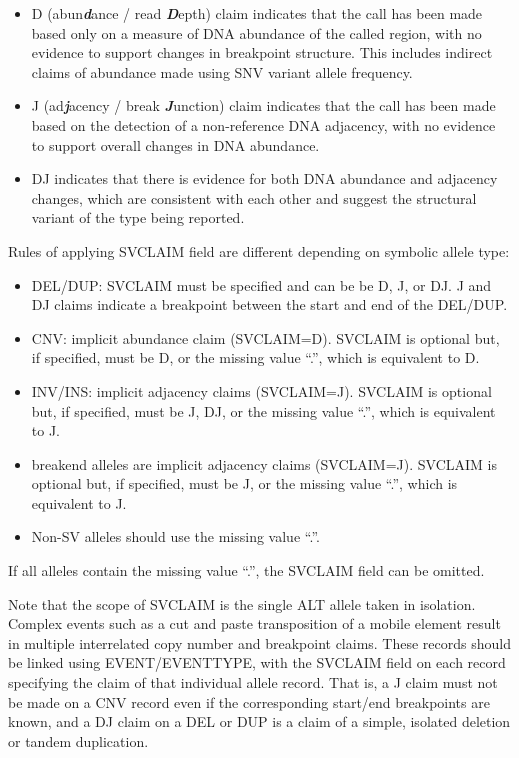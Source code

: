 \documentclass[8pt]{article}
\begin{document}
\begin{itemize}
  \item D (abun\textbf{\emph{d}}ance / read \textbf{\emph{D}}epth) claim indicates that the call has been made based only on a measure of DNA abundance of the called region, with no evidence to support changes in breakpoint structure. This includes indirect claims of abundance made using SNV variant allele frequency.
  \item J (ad\textbf{\emph{j}}acency / break \textbf{\emph{J}}unction) claim indicates that the call has been made based on the detection of a non-reference DNA adjacency, with no evidence to support overall changes in DNA abundance.
  \item DJ indicates that there is evidence for both DNA abundance and adjacency changes, which are consistent with each other and suggest the structural variant of the type being reported.
\end{itemize}

Rules of applying SVCLAIM field are different depending on symbolic allele type:

\begin{itemize}
  \item DEL/DUP: SVCLAIM must be specified and can be be D, J, or DJ. J and DJ claims indicate a breakpoint between the start and end of the DEL/DUP.
  \item CNV: implicit abundance claim (SVCLAIM=D). SVCLAIM is optional but, if specified, must be D, or the missing value ``.'', which is equivalent to D.
  \item INV/INS: implicit adjacency claims (SVCLAIM=J). SVCLAIM is optional but, if specified, must be J, DJ, or the missing value ``.'', which is equivalent to J.
  \item breakend alleles are implicit adjacency claims (SVCLAIM=J). SVCLAIM is optional but, if specified, must be J, or the missing value ``.'', which is equivalent to J.
  \item Non-SV alleles should use the missing value ``.''.
\end{itemize}

If all alleles contain the missing value ``.'', the SVCLAIM field can be omitted.

Note that the scope of SVCLAIM is the single ALT allele taken in isolation.
Complex events such as a cut and paste transposition of a mobile element result in multiple interrelated copy number and breakpoint claims.
These records should be linked using EVENT/EVENTTYPE, with the SVCLAIM field on each record specifying the claim of that individual allele record.
That is, a J claim must not be made on a CNV record even if the corresponding start/end breakpoints are known, and a DJ claim on a DEL or DUP is a claim of a simple, isolated deletion or tandem duplication.
\end{document}
